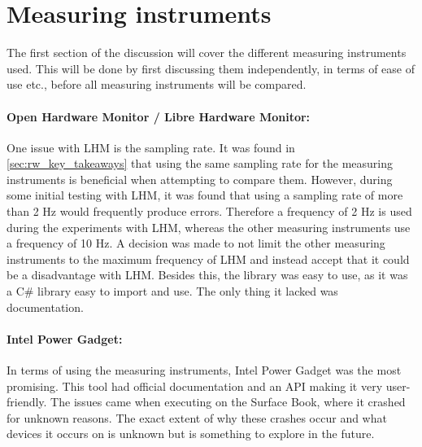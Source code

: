 \section{Measuring instruments}

The first section of the discussion will cover the different measuring instruments used. This will be done by first discussing them independently, in terms of ease of use etc., before all measuring instruments will be compared.

\paragraph*{Open Hardware Monitor / Libre Hardware Monitor:} One issue with LHM is the sampling rate. It was found in \cref{sec:rw_key_takeaways} that using the same sampling rate for the measuring instruments is beneficial when attempting to compare them. However, during some initial testing with LHM, it was found that using a sampling rate of more than 2 Hz would frequently produce errors. Therefore a frequency of 2 Hz is used during the experiments with LHM, whereas the other measuring instruments use a frequency of 10 Hz. A decision was made to not limit the other measuring instruments to the maximum frequency of LHM and instead accept that it could be a disadvantage with LHM. Besides this, the library was easy to use, as it was a C\# library easy to import and use. The only thing it lacked was documentation.

\paragraph*{Intel Power Gadget:} In terms of using the measuring instruments, Intel Power Gadget was the most promising. This tool had official documentation and an API making it very user-friendly. The issues came when executing on the Surface Book, where it crashed for unknown reasons. The exact extent of why these crashes occur and what devices it occurs on is unknown but is something to explore in the future.

